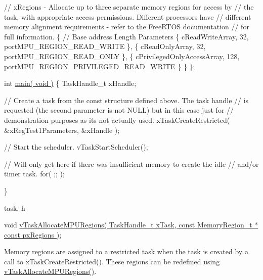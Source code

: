 \begin{DoxyPre}    // xRegions - Allocate up to three separate memory regions for access by
    // the task, with appropriate access permissions.  Different processors have
    // different memory alignment requirements - refer to the FreeRTOS documentation
    // for full information.
    \{
        // Base address                 Length  Parameters
        \{ cReadWriteArray,              32,     portMPU\_REGION\_READ\_WRITE \},
        \{ cReadOnlyArray,               32,     portMPU\_REGION\_READ\_ONLY \},
        \{ cPrivilegedOnlyAccessArray,   128,    portMPU\_REGION\_PRIVILEGED\_READ\_WRITE \}
    \}
\};\end{DoxyPre}



\begin{DoxyPre}int \hyperlink{main_8c_a840291bc02cba5474a4cb46a9b9566fe}{main( void )}
\{
TaskHandle\_t xHandle;
\begin{DoxyVerb}// Create a task from the const structure defined above.  The task handle
// is requested (the second parameter is not NULL) but in this case just for
// demonstration purposes as its not actually used.
xTaskCreateRestricted( &xRegTest1Parameters, &xHandle );

// Start the scheduler.
vTaskStartScheduler();

// Will only get here if there was insufficient memory to create the idle
// and/or timer task.
for( ;; );
\end{DoxyVerb}

\}
   \end{DoxyPre}


task. h 
\begin{DoxyPre}
 void \hyperlink{task_8h_ad889595baff9faf9efe02f3696825409}{vTaskAllocateMPURegions( TaskHandle\_t xTask, const MemoryRegion\_t * const pxRegions )};\end{DoxyPre}


Memory regions are assigned to a restricted task when the task is created by a call to x\+Task\+Create\+Restricted(). These regions can be redefined using \hyperlink{task_8h_ad889595baff9faf9efe02f3696825409}{v\+Task\+Allocate\+M\+P\+U\+Regions()}.


